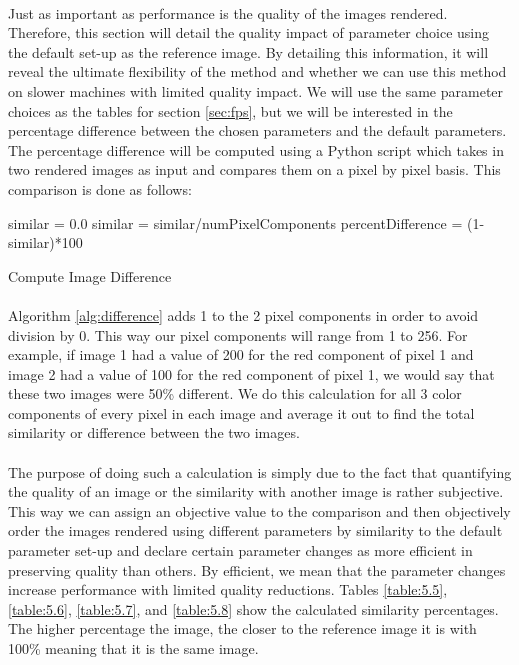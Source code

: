 \paragraph{}
Just as important as performance is the quality of the images rendered.  Therefore, this section will detail the quality impact of parameter choice using the default set-up as the reference image.  By detailing this information, it will reveal the ultimate flexibility of the method and whether we can use this method on slower machines with limited quality impact.  We will use the same parameter choices as the tables for section \ref{sec:fps}, but we will be interested in the percentage difference between the chosen parameters and the default parameters.  The percentage difference will be computed using a Python script which takes in two rendered images as input and compares them on a pixel by pixel basis.  This comparison is done as follows:

\vspace{5 mm}
\begin{algorithm}[H]
 similar = 0.0\;
 similar = similar/numPixelComponents\;
 percentDifference = (1-similar)*100\;
 \caption{Compute Image Difference}
 \label{alg:difference}
\end{algorithm}

\paragraph{}
Algorithm \ref{alg:difference} adds 1 to the 2 pixel components in order to avoid division by 0.  This way our pixel components will range from 1 to 256.  For example, if image 1 had a value of 200 for the red component of pixel 1 and image 2 had a value of 100 for the red component of pixel 1, we would say that these two images were 50\% different.  We do this calculation for all 3 color components of every pixel in each image and average it out to find the total similarity or difference between the two images.

\paragraph{}
The purpose of doing such a calculation is simply due to the fact that quantifying the quality of an image or  the similarity with another image is rather subjective.  This way we can assign an objective value to the comparison and then objectively order the images rendered using different parameters by similarity to the default parameter set-up and declare certain parameter changes as more efficient in preserving quality than others.  By efficient, we mean that the parameter changes increase performance with limited quality reductions.  Tables \ref{table:5.5}, \ref{table:5.6}, \ref{table:5.7}, and \ref{table:5.8} show the calculated similarity percentages.  The higher percentage the image, the closer to the reference image it is with 100\% meaning that it is the same image.


